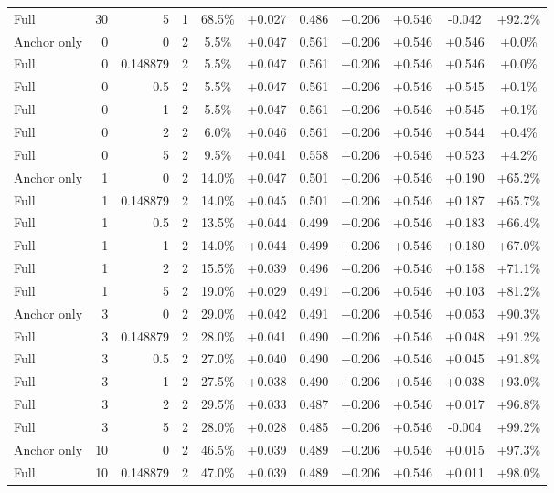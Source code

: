 \begin{table}[htbp]
\begin{tabular}{lrrrccccccc}
Full & 30 & 5 & 1 & 68.5\% & +0.027 & 0.486 & +0.206 & +0.546 & -0.042 & +92.2\% \\
Anchor only & 0 & 0 & 2 & 5.5\% & +0.047 & 0.561 & +0.206 & +0.546 & +0.546 & +0.0\% \\
Full & 0 & 0.148879 & 2 & 5.5\% & +0.047 & 0.561 & +0.206 & +0.546 & +0.546 & +0.0\% \\
Full & 0 & 0.5 & 2 & 5.5\% & +0.047 & 0.561 & +0.206 & +0.546 & +0.545 & +0.1\% \\
Full & 0 & 1 & 2 & 5.5\% & +0.047 & 0.561 & +0.206 & +0.546 & +0.545 & +0.1\% \\
Full & 0 & 2 & 2 & 6.0\% & +0.046 & 0.561 & +0.206 & +0.546 & +0.544 & +0.4\% \\
Full & 0 & 5 & 2 & 9.5\% & +0.041 & 0.558 & +0.206 & +0.546 & +0.523 & +4.2\% \\
Anchor only & 1 & 0 & 2 & 14.0\% & +0.047 & 0.501 & +0.206 & +0.546 & +0.190 & +65.2\% \\
Full & 1 & 0.148879 & 2 & 14.0\% & +0.045 & 0.501 & +0.206 & +0.546 & +0.187 & +65.7\% \\
Full & 1 & 0.5 & 2 & 13.5\% & +0.044 & 0.499 & +0.206 & +0.546 & +0.183 & +66.4\% \\
Full & 1 & 1 & 2 & 14.0\% & +0.044 & 0.499 & +0.206 & +0.546 & +0.180 & +67.0\% \\
Full & 1 & 2 & 2 & 15.5\% & +0.039 & 0.496 & +0.206 & +0.546 & +0.158 & +71.1\% \\
Full & 1 & 5 & 2 & 19.0\% & +0.029 & 0.491 & +0.206 & +0.546 & +0.103 & +81.2\% \\
Anchor only & 3 & 0 & 2 & 29.0\% & +0.042 & 0.491 & +0.206 & +0.546 & +0.053 & +90.3\% \\
Full & 3 & 0.148879 & 2 & 28.0\% & +0.041 & 0.490 & +0.206 & +0.546 & +0.048 & +91.2\% \\
Full & 3 & 0.5 & 2 & 27.0\% & +0.040 & 0.490 & +0.206 & +0.546 & +0.045 & +91.8\% \\
Full & 3 & 1 & 2 & 27.5\% & +0.038 & 0.490 & +0.206 & +0.546 & +0.038 & +93.0\% \\
Full & 3 & 2 & 2 & 29.5\% & +0.033 & 0.487 & +0.206 & +0.546 & +0.017 & +96.8\% \\
Full & 3 & 5 & 2 & 28.0\% & +0.028 & 0.485 & +0.206 & +0.546 & -0.004 & +99.2\% \\
Anchor only & 10 & 0 & 2 & 46.5\% & +0.039 & 0.489 & +0.206 & +0.546 & +0.015 & +97.3\% \\
Full & 10 & 0.148879 & 2 & 47.0\% & +0.039 & 0.489 & +0.206 & +0.546 & +0.011 & +98.0\% \\

\end{tabular}
\end{table}
